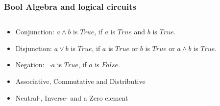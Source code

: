 \documentclass{beamer}
\begin{document}
\begin{frame}\frametitle{Bool Algebra and logical circuits}
\begin{columns}
\begin{column}{6cm}
\begin{itemize}
\item<1-> Conjunction: $a\land b$ is $True$, if $a$ is $True$ and $b$ is $True$.\\
\pause
\item<2-> Disjunction: $a\lor b$  is $True$, if $a$ is $True$ or $b$ is $True$ or $a\wedge b$ is $True$.\\
\pause
\item<3-> Negation:  $\neg a$ is $True$, if $a$ is $False$. 
\pause
\item<4-> Associative, Commutative and Distributive
\pause
\item<5-> Neutral-, Inverse- and a Zero element
\end{itemize}
\end{column}
\begin{column}{6cm}
\end{column}
\end{columns}
\end{frame}
\end{document}
